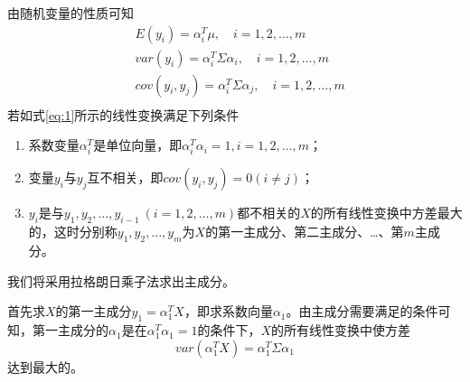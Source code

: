 \documentclass[lang=cn,11pt,a4paper,cite=authoryear]{elegantpaper}
\begin{document}
由随机变量的性质可知
\begin{align}
	&E(y_i)=\alpha_i^T\mu, \quad i=1, 2, \dots,m\\
	&var(y_i)=\alpha_i^T\Sigma\alpha_i, \quad i=1, 2, \dots,m\\
	&cov(y_i,y_j)=\alpha_i^T\Sigma\alpha_j, \quad i=1, 2, \dots,m\\
\end{align}
若如式\ref{eq:1}所示的线性变换满足下列条件

\begin{enumerate}
\item 系数变量$\alpha_i^T$是单位向量，即$\alpha_i^T\alpha_i=1, i=1,2,\dots,m$；
\item 变量$y_i$与$y_j$互不相关，即$cov(y_i,y_j)=0(i\not=j)$；
\item $y_i$是与$y_1,y_2,\dots,y_{i-1}\ (i=1, 2,\dots,m)$都不相关的$X$的所有线性变换中方差最大的，这时分别称$y_1,y_2,\dots,y_m$为$X$的第一主成分、第二主成分、…、第$m$主成分。
\end{enumerate}
	
我们将采用拉格朗日乘子法求出主成分。

首先求$X$的第一主成分$y_1=\alpha_1^TX$，即求系数向量$\alpha_1$。由主成分需要满足的条件可知，第一主成分的$\alpha_1$是在$\alpha_1^T\alpha_1=1$的条件下，$X$的所有线性变换中使方差
\begin{equation}
var(\alpha_1^TX)=\alpha_1^T\Sigma\alpha_1
\end{equation}
达到最大的。
\end{document}
